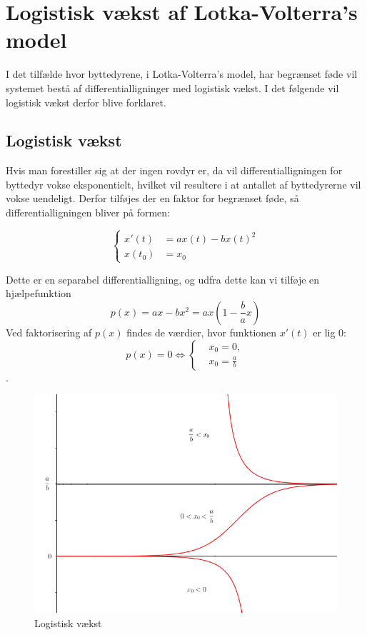 \chapter{Logistisk vækst af Lotka-Volterra's model}
I det tilfælde hvor byttedyrene, i Lotka-Volterra's model, har begrænset føde vil systemet bestå af differentialligninger med logistisk vækst. I det følgende vil logistisk vækst derfor blive forklaret.\\
\hfill \break

\section{Logistisk vækst}\label{lovaeg}
Hvis man forestiller sig at der ingen rovdyr er, da vil differentialligningen for byttedyr vokse eksponentielt, hvilket vil resultere i at antallet af byttedyrerne vil vokse uendeligt. Derfor tilføjes der en faktor for begrænset føde, så differentialligningen bliver på formen:

\begin{equation}\label{logvivp}
    \begin{cases}
    x'(t)&=ax(t)-bx(t)^2\\
    x(t_0)&=x_0
    \end{cases}
\end{equation}

Dette er en separabel differentialligning, og udfra dette kan vi tilføje en hjælpefunktion 
\begin{equation*}
    p(x)=ax-bx^2=ax\left(1-\frac{b}{a}x\right)
\end{equation*}
Ved faktorisering af $p(x)$ findes de værdier, hvor funktionen $x'(t)$ er lig $0$:
\begin{equation}
p(x)=0 \Leftrightarrow
    \begin{cases}
    &x_0 = 0,\\ 
    &x_0 = \frac{a}{b}
    \end{cases}
\end{equation}.

\begin{figure} [H]
    \centering
    \includegraphics[scale=0.5]{Images/logi.png}
    \caption{Logistisk vækst}
    \label{logi}
\end{figure}

